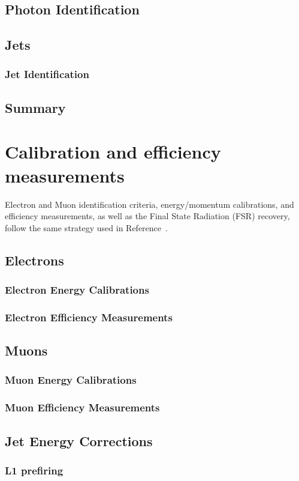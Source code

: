 \subsection{Photon Identification}
\label{sec:photonID}


\subsection{Jets}
\subsubsection{Jet Identification}


\subsection{Summary}


\section{Calibration and efficiency measurements}
Electron and Muon identification criteria, energy/momentum calibrations, and efficiency measurements,
as well as the Final State Radiation (FSR) recovery, follow the same strategy used in Reference~\cite{CMS-SMP-20-001}. %

\subsection{Electrons}
\subsubsection{Electron Energy Calibrations}

\subsubsection{Electron Efficiency Measurements}
\label{sec:eleEffMeas}


\subsection{Muons}
\subsubsection{Muon Energy Calibrations}

\subsubsection{Muon Efficiency Measurements}
\label{sec:muonEffMeas}


\subsection{Jet Energy Corrections}


\subsubsection{L1 prefiring}

